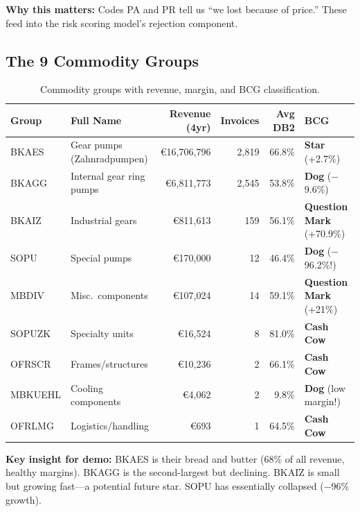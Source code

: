 \documentclass[11pt,a4paper]{article}
\newcommand{\EUR}{\euro{}}
\begin{document}
\textbf{Why this matters:} Codes PA and PR tell us ``we lost because of price.'' These feed into the risk scoring model's rejection component.

\subsection{The 9 Commodity Groups}

\begin{table}[H]
\centering
\small
\begin{tabularx}{\textwidth}{l X r r r l}
\toprule
\textbf{Group} & \textbf{Full Name} & \textbf{Revenue (4yr)} & \textbf{Invoices} & \textbf{Avg DB2} & \textbf{BCG} \\
\midrule
BKAES   & Gear pumps (Zahnradpumpen)    & \EUR16{,}706{,}796 & 2{,}819 & 66.8\% & \textbf{Star} (+2.7\%) \\
BKAGG   & Internal gear ring pumps      & \EUR6{,}811{,}773  & 2{,}545 & 53.8\% & \textbf{Dog} ($-$9.6\%) \\
BKAIZ   & Industrial gears              & \EUR811{,}613      & 159     & 56.1\% & \textbf{Question Mark} (+70.9\%) \\
SOPU    & Special pumps                 & \EUR170{,}000      & 12      & 46.4\% & \textbf{Dog} ($-$96.2\%!) \\
MBDIV   & Misc.\ components             & \EUR107{,}024      & 14      & 59.1\% & \textbf{Question Mark} (+21\%) \\
SOPUZK  & Specialty units               & \EUR16{,}524       & 8       & 81.0\% & \textbf{Cash Cow} \\
OFRSCR  & Frames/structures             & \EUR10{,}236       & 2       & 66.1\% & \textbf{Cash Cow} \\
MBKUEHL & Cooling components            & \EUR4{,}062        & 2       & 9.8\%  & \textbf{Dog} (low margin!) \\
OFRLMG  & Logistics/handling            & \EUR693            & 1       & 64.5\% & \textbf{Cash Cow} \\
\bottomrule
\end{tabularx}
\caption{Commodity groups with revenue, margin, and BCG classification.}
\end{table}

\textbf{Key insight for demo:} BKAES is their bread and butter (68\% of all revenue, healthy margins). BKAGG is the second-largest but declining. BKAIZ is small but growing fast---a potential future star. SOPU has essentially collapsed ($-$96\% growth).
\end{document}

